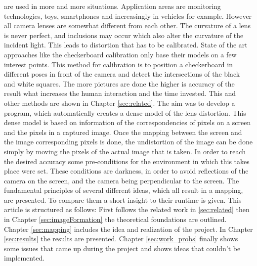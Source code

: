 \documentclass[journal,final,a4paper,twoside]{PS}
\begin{document}
 are used in more and more situations. Application areas are monitoring technologies, toys, smartphones and increasingly in vehicles for example. However all camera lenses are somewhat different from each other. The curvature of a lens is never perfect, and inclusions may occur which also alter the curvature of the incident light. This leads to distortion that has to be calibrated. State of the art approaches like the checkerboard calibration only base their models on a few interest points. This method for calibration is to position a checkerboard in different poses in front of the camera and detect the intersections of the black and white squares. The more pictures are done the higher is accuracy of the result what increases the human interaction and the time invested. This and other methods are shown in Chapter \ref{sec:related}. 
The aim was to develop a program, which automatically creates a dense model of the lens distortion. This dense model is based on information of the correspondencies of pixels on a screen and the pixels in a captured image. Once the mapping between the screen and the image corresponding pixels is done, the undistortion of the image can be done simply by moving the pixels of the actual image that is taken. In order to reach the desired accuracy some pre-conditions for the environment in which this takes place were set. These conditions are darkness, in order to avoid reflections of the camera on the screen, and the camera being perpendicular to the screen. The fundamental principles of several different ideas, which all result in a mapping, are presented. To compare them a short insight to their runtime is given. This article is structured as follows: First follows the related work in \ref{sec:related} then in Chapter \ref{sec:imageFormation} the theoretical  foundations are outlined. Chapter \ref{sec:mapping} includes the idea and realization of the project. In Chapter \ref{sec:results} the results are presented. Chapter \ref{sec:work_probs} finally shows some issues that came up during the project and shows ideas that couldn't be implemented.
\end{document}
